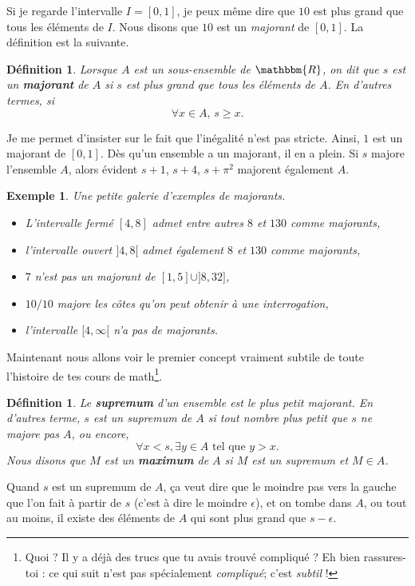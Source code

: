 \documentclass[a4paper,12pt]{book}
\newcommand{\eR}{\mathbbm{R}}
\newcounter{numtho}
\theoremstyle{mes_exemples}	\newtheorem{exemple}[numtho]{Exemple}
\theoremstyle{mes_tho}
\newtheorem{definition}[numtho]{Définition}
\newcommand{\defe}[2]{\textbf{#1}\index{#2}}
\begin{document}
  Si je regarde l'intervalle $I=[0,1]$, je peux même dire que $10$ est plus grand que tous les éléments de $I$. Nous disons que $10$ est un \emph{majorant} de $[0,1]$. La définition est la suivante.
\begin{definition}
Lorsque $A$ est un sous-ensemble de $\eR$, on dit que $s$ est un \defe{majorant}{Majorant} de $A$ si $s$ est plus grand que tous les éléments de $A$. En d'autres termes, si
\[
  \forall x\in A,\,s\geq x.
\]
\end{definition}
Je me permet d'insister sur le fait que l'inégalité n'est pas stricte. Ainsi, $1$ est un majorant de $[0,1]$. Dès qu'un ensemble a un majorant, il en a plein. Si $s$ majore l'ensemble $A$, alors évident $s+1$, $s+4$, $s+\pi^2$ majorent également $A$.
\begin{exemple}
Une petite galerie d'exemples de majorants.
\begin{itemize}
\item L'intervalle fermé $[4,8]$ admet entre autres $8$ et $130$ comme majorants,
\item l'intervalle ouvert $]4,8[$ admet également $8$ et $130$ comme majorants,
\item $7$ n'est pas un majorant de $[1,5]\cup]8,32]$,
\item $10/10$ majore les côtes qu'on peut obtenir à une interrogation,
\item l'intervalle $[4,\infty[$ n'a pas de majorants.
\end{itemize}
\end{exemple}
Maintenant nous allons voir le premier concept vraiment subtile de toute l'histoire de tes cours de math\footnote{Quoi ? Il y a déjà des trucs que tu avais trouvé compliqué ? Eh bien rassures-toi : ce qui suit n'est pas spécialement \emph{compliqué}; c'est \emph{subtil} !}.
\begin{definition}
Le \defe{supremum}{Supremum} d'un ensemble est le plus petit majorant. En d'autres terme, $s$ est un supremum de $A$ si tout nombre plus petit que $s$ ne majore pas $A$, ou encore,
\[
  \forall x<s,\exists y\in A\text{ tel que } y>x.
\]
Nous disons que $M$ est un \defe{maximum}{Maximum} de $A$ si $M$ est un supremum \emph{et} $M\in A$.
\end{definition}
Quand $s$ est un supremum de $A$, ça veut dire que le moindre pas vers la gauche que l'on fait à partir de $s$ (c'est à dire le moindre $\epsilon$), et on tombe dans $A$, ou tout au moins, il existe des éléments de $A$ qui sont plus grand que $s-\epsilon$.
\end{document}
